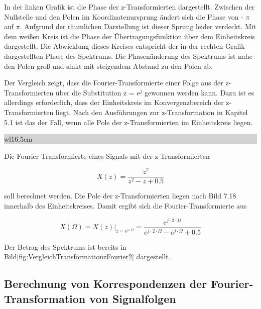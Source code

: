 \noindent In der linken Grafik ist die Phase der z-Transformierten dargestellt. Zwischen der Nullstelle und den Polen im Koordinatenursprung \"{a}ndert sich die Phase von - $\pi$ auf $\pi$. Aufgrund der r\"{a}umlichen Darstellung ist dieser Sprung leider verdeckt. Mit dem wei{\ss}en Kreis ist die Phase der \"{U}bertragungsfunktion \"{u}ber dem Einheitskreis dargestellt. Die Abwicklung dieses Kreises entspricht der in der rechten Grafik dargestellten Phase des Spektrums. Die Phasen\"{a}nderung des Spektrums ist nahe den Polen gro{\ss} und sinkt mit steigendem Abstand zu den Polen ab.\newline

\noindent Der Vergleich zeigt, dass die Fourier-Transformierte einer Folge aus der z-Transformierten \"{u}ber die Substitution z = e${}^{j}$ gewonnen werden kann. Dazu ist es allerdings erforderlich, dass der Einheitskreis im Konvergenzbereich der z-Transformierten liegt. Nach den Ausf\"{u}hrungen zur z-Transformation in Kapitel 5.1 ist das der Fall, wenn alle Pole der z-Transformierten im Einheitskreis liegen.\bigskip

\noindent
\colorbox{lightgray}{%
%
\renewcommand\arraystretch{0.6}%
\begin{tabular}{ wl{16.5cm} }
{\selectfont{Beispiel: Berechnung der Fourier-Transformierten aus der z-Transformierten}}
\end{tabular}%
}\medskip

\noindent Die Fourier-Transformierte eines Signals mit der z-Transformierten 

\begin{equation}\label{eq:sevenonehundredseven}
X\left(z\right)=\frac{z^{2} }{z^{2} -z+0.5}
\end{equation}

\noindent soll berechnet werden. Die Pole der z-Transformierten liegen nach Bild 7.18 innerhalb des Einheitskreises. Damit ergibt sich die Fourier-Transformierte aus

\begin{equation}\label{eq:sevenonehundredeight}
X\left(\Omega \right)=\left. X\left(z\right)\right|_{z=e^{j\cdot \Omega } } =\frac{e^{j\cdot 2\cdot \Omega } }{e^{j\cdot 2\cdot \Omega } -e^{j\cdot \Omega } +0.5}
\end{equation}

\noindent Der Betrag des Spektrums ist bereits in Bild\ref{fig:VergleichTransformationzFourier2} dargestellt.
\clearpage
\subsection{Berechnung von Korrespondenzen der Fourier-Transformation von Signalfolgen}

